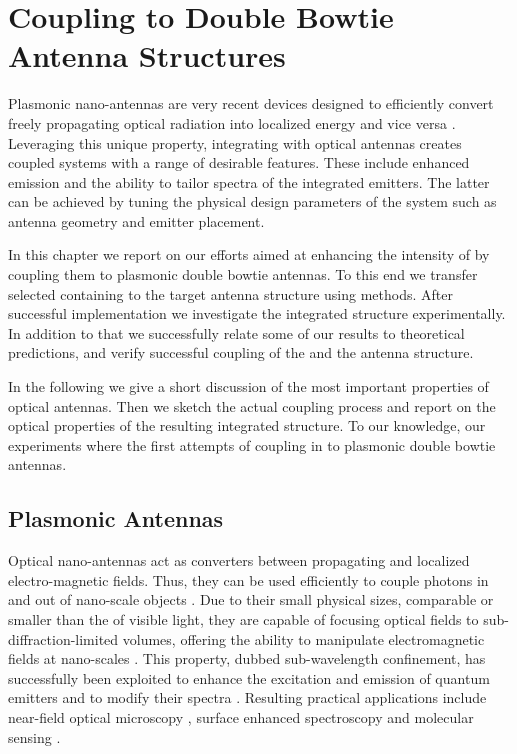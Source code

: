 \section[Coupling \Nds to Optical Antennas]{Coupling \Nds to Double Bowtie Antenna Structures} \label{sec::coupling_antennas}

	Plasmonic nano-antennas are very recent devices designed to efficiently convert freely propagating optical radiation into localized energy and vice versa \cite{Bharadwaj2009, ballanis1997antenna, ding2009understanding}. Leveraging this unique property, integrating \sivs with optical antennas creates coupled systems with a range of desirable features. These include enhanced \pl emission and the ability to tailor \pl spectra of the integrated emitters. The latter can be achieved by tuning the physical design parameters of the system such as antenna geometry and emitter placement.
	
	In this chapter we report on our efforts aimed at enhancing the \pl intensity of \sivs by coupling them to plasmonic double bowtie antennas. To this end we transfer selected \nds containing \sivs to the target antenna structure using \pp methods. After successful implementation we investigate the integrated structure experimentally. In addition to that we successfully relate some of our results to theoretical predictions, and verify successful coupling of the \siv and the antenna structure.
	
	In the following we give a short discussion of the most important properties of optical antennas. Then we sketch the actual coupling process and report on the optical properties of the resulting integrated structure. To our knowledge, our experiments where the first attempts of coupling \sivs in \nds to plasmonic double bowtie antennas.

	\subsection{Plasmonic Antennas}

		Optical nano-antennas act as converters between propagating and localized electro-magnetic fields. Thus, they can be used efficiently to couple photons in and out of nano-scale objects \cite{Curto2010}. Due to their small physical sizes, comparable or smaller than the \wl of visible light, they are capable of focusing optical fields to sub-diffraction-limited volumes, offering the ability to manipulate electromagnetic fields at nano-scales \cite{taminiau2008optical, ding2009understanding}. This property, dubbed sub-wavelength confinement, has successfully been exploited to enhance the excitation and emission of quantum emitters \cite{taminiau2008enhanced, taminiau2008single, kuhn2006enhancement, muskens2007strong} and to modify their spectra \cite{ringler2008shaping}. Resulting practical applications include near-field optical microscopy \cite{keilmann2004near}, surface enhanced spectroscopy \cite{kneipp1997single, martin2014high} and molecular sensing \cite{larsson2007sensing}.
		
